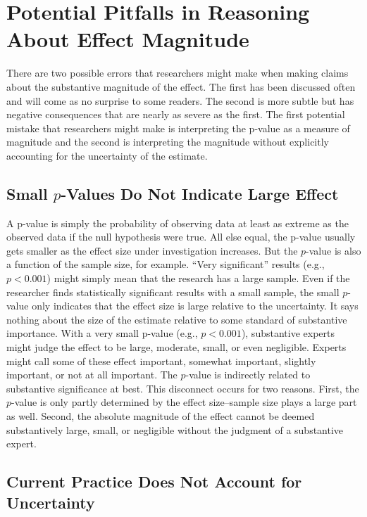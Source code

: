 \documentclass[12pt]{article}
\begin{document}
\section*{Potential Pitfalls in Reasoning About Effect Magnitude}

There are two possible errors that researchers might make when making claims about the substantive magnitude of the effect. The first has been discussed often and will come as no surprise to some readers. The second is more subtle but has negative consequences that are nearly as severe as the first. The first potential mistake that researchers might make is interpreting the p-value as a measure of magnitude and the second is interpreting the magnitude without explicitly accounting for the uncertainty of the estimate. 

\subsection*{Small $p$-Values Do Not Indicate Large Effect}


A p-value is simply the probability of observing data at least as extreme as the observed data if the null hypothesis were true. All else equal, the p-value usually gets smaller as the effect size under investigation increases. But the $p$-value is also a function of the sample size, for example. ``Very significant'' results (e.g., $p < 0.001$) might simply mean that the research has a large sample. Even if the researcher finds statistically significant results with a small sample, the small $p$-value only indicates that the effect size is large relative to the uncertainty. It says nothing about the size of the estimate relative to some standard of substantive importance. With a very small p-value (e.g., $p < 0.001$), substantive experts might judge the effect to be large, moderate, small, or even negligible. Experts might call some of these effect important, somewhat important, slightly important, or not at all important. The $p$-value is indirectly related to substantive significance at best. This disconnect occurs for two reasons. First, the $p$-value is only partly determined by the effect size--sample size plays a large part as well. Second, the absolute magnitude of the effect cannot be deemed substantively large, small, or negligible without the judgment of a substantive expert. 

\subsection*{Current Practice Does Not Account for Uncertainty}
\end{document}
